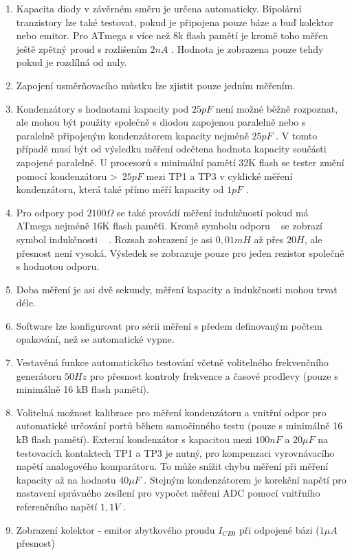 \begin{enumerate}
\item Kapacita diody v závěrném směru je určena automaticky.
Bipolární tranzistory lze také testovat, pokud je připojena pouze báze a buď kolektor nebo emitor.
Pro ATmega s více než 8k flash pamětí je kromě toho měřen ještě zpětný proud s rozlišením \(2nA\) .
Hodnota je zobrazena pouze tehdy pokud je rozdílná od nuly.
\item Zapojení usměrňovacího můstku lze zjistit pouze jedním měřením.
\item Kondenzátory s hodnotami kapacity pod \(25pF\) není možné běžně rozpoznat, 
ale mohou být použity společně s diodou zapojenou paralelně nebo s paralelně připojeným kondenzátorem
kapacity nejméně \(25pF\) .
V tomto případě musí být od výsledku měření odečtena hodnota kapacity součásti zapojené paralelně.
U procesorů s minimální pamětí 32K flash se tester změní pomocí kondenzátoru \textgreater~\(25pF\)
mezi TP1 a TP3 v cyklické měření kondenzátoru, která také přímo měří kapacity od \(1pF\) .
\item Pro odpory pod \(2100\Omega\) se také provádí měření indukčnosti pokud
má ATmega nejméně 16K flash paměťi.
Kromě symbolu odporu \mbox{~\electricR} se zobrazí symbol indukčnosti \mbox{~\electricL} .
Rozsah zobrazení je asi \(0,01mH\) až přes \(20H\), ale přesnost není vysoká.
Výsledek se zobrazuje pouze pro jeden rezistor společně s hodnotou odporu.
\item Doba měření je asi dvě sekundy, měření kapacity a indukčnosti mohou trvat déle.
\item Software lze konfigurovat pro sérii měření s předem definovaným počtem opakování, než se automatické vypne.
\item Vestavěná funkce automatického testování včetně volitelného frekvenčního generátoru \(50Hz\)  pro přesnost kontroly frekvence
a časové prodlevy (pouze s minimálně 16 kB flash pamětí).
\item Volitelná možnost kalibrace pro měření kondenzátoru a vnitřní odpor pro
automatické určování portů během samočinného testu (pouze s minimálně 16 kB flash pamětí).
Externí kondenzátor s kapacitou mezi \(100nF\) a \(20\mu F\) na testovacích kontaktech TP1 a TP3 je nutný, 
pro kompenzaci vyrovnávacího napětí analogového komparátoru.
To může snížit chybu měření při měření kapacity až na hodnotu \(40\mu F\) .
Stejným kondenzátorem je korekční napětí pro nastavení správného zesílení pro
vypočet měření ADC pomocí vnitřního referenčního napětí \(1,1V\) .
\item Zobrazení kolektor - emitor zbytkového proudu \(I_{CE0}\) při odpojené bázi (\(1\mu A\) přesnost) 

\end{enumerate}

